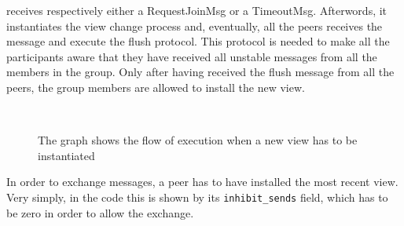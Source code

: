 \documentclass[conference]{IEEEtran}
\begin{document}
receives respectively either a RequestJoinMsg or a TimeoutMsg.
Afterwords, it instantiates the view change process and,
eventually, all the peers receives the message and execute the flush
protocol. This protocol is needed to make all the participants aware
that they have received all unstable messages from all the members
in the group.
Only after having received the flush message from all the peers, the 
group members are allowed to install the new view. \\
\begin{figure}[ht]%
	\centering
	\\%
	\caption{The graph shows the flow of execution when a new view has
	to be instantiated}%
	\label{fig:NewView}%
\end{figure}
In order to exchange messages, a peer has to have installed the most 
recent view. Very simply, in the code this is shown by its
\texttt{inhibit\_sends} field, which has to be zero in order to allow 
the exchange. 

\end{document}
